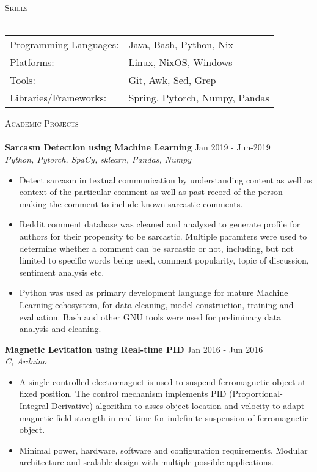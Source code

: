 \documentclass[a4paper]{article}
\newcommand{\lineunder} {
    \vspace*{-8pt} \\
    \hspace*{-18pt} \hrulefill \\
}
\newcommand{\header} [1] {
    {\hspace*{-18pt}\vspace*{6pt} \textsc{#1}}
    \vspace*{-6pt} \lineunder
}
\begin{document}
\header{Skills}
\vspace{1mm}
\begin{tabular}{ l l }
	Programming Languages: & Java, Bash, Python, Nix        \\
	Platforms:             & Linux, NixOS, Windows          \\
	Tools:                 & Git, Awk, Sed, Grep            \\
	Libraries/Frameworks:  & Spring, Pytorch, Numpy, Pandas \\
\end{tabular}
\vspace{2mm}

\pagebreak
\header{Academic Projects}
\vspace{1mm}
{\textbf{Sarcasm Detection using Machine Learning}} \hfill Jan 2019 - Jun-2019\\
\textit{Python, Pytorch, SpaCy, sklearn, Pandas, Numpy} \\
\begin{itemize}
    \item Detect sarcasm in textual communication by understanding content as well as context of the particular comment as well as past record of the person making the comment to include known sarcastic comments.\\
  \item Reddit comment database was cleaned and analyzed to generate profile for authors for their propensity to be sarcastic. Multiple paramters were used to determine whether a comment can be sarcastic or not, including, but not limited to specific words being used, comment popularity, topic of discussion, sentiment analysis etc.
  \item Python was used as primary development language for mature Machine Learning echosystem, for data cleaning, model construction, training and evaluation. Bash and other GNU tools were used for preliminary data analysis and cleaning.
\end{itemize}
\vspace*{2mm}

{\textbf{Magnetic Levitation using Real-time PID}} \hfill Jan 2016 - Jun 2016\\
\textit{C, Arduino} \\
\begin{itemize}
    \item A single controlled electromagnet is used to suspend ferromagnetic object at fixed position. The control mechanism implements PID (Proportional-Integral-Derivative) algorithm to asses object location and velocity to adapt magnetic field strength in real time for indefinite suspension of ferromagnetic object.\\
  \item Minimal power, hardware, software and configuration requirements. Modular architecture and scalable design with multiple possible applications.
\end{itemize}
\vspace*{2mm}
\end{document}
